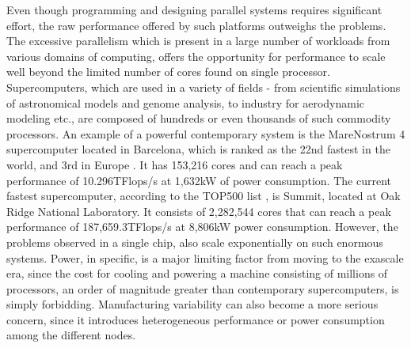 Even though programming and designing parallel systems requires significant effort, the
raw performance offered by such platforms outweighs the problems.  The excessive
parallelism which is present in a large number of workloads from various domains of
computing, offers the opportunity for performance to scale well beyond the limited number
of cores found on single processor.  Supercomputers, which are used in a variety of fields
- from scientific simulations of astronomical models and genome analysis, to industry for
aerodynamic modeling etc., are composed of hundreds or even thousands of such commodity
processors.  An example of a powerful contemporary system is the MareNostrum 4
supercomputer located in Barcelona, which is ranked as the 22nd fastest in the world, and
3rd in Europe \cite{TOP500}.  It has 153,216 cores and can reach a peak performance of
10.296TFlops/s at 1,632kW of power consumption.  The current fastest supercomputer,
according to the TOP500 list \cite{TOP500}, is Summit, located at Oak Ridge National
Laboratory.  It consists of 2,282,544 cores that can reach a peak performance of
187,659.3TFlops/s at 8,806kW power consumption.  However, the problems observed in a
single chip, also scale exponentially on such enormous systems.  Power, in specific, is a
major limiting factor from moving to the exascale era, since the cost for cooling and
powering a machine consisting of millions of processors, an order of magnitude greater
than contemporary supercomputers, is simply forbidding.  Manufacturing variability can
also become a more serious concern, since it introduces heterogeneous performance or power
consumption among the different nodes.

